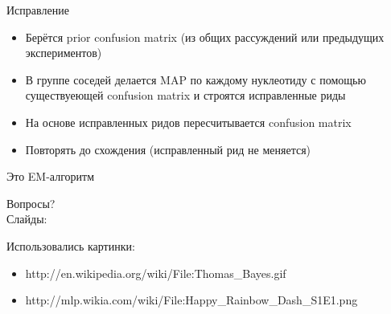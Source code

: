 \documentclass[10pt]{beamer}
\begin{document}
\begin{frame}{Исправление}
  \begin{itemize}
  \item Берётся prior confusion matrix (из общих рассуждений или
    предыдущих экспериментов)
  \item В группе соседей делается MAP по каждому нуклеотиду с помощью
    существуеющей confusion matrix и строятся исправленные риды
  \item На основе исправленных ридов пересчитывается confusion matrix
  \item Повторять до схождения (исправленный рид не меняется)
  \end{itemize}
  Это EM-алгоритм
\end{frame}

\begin{frame}[plain]
\end{frame}

\begin{frame}
  \begin{center}
    \Large
    Вопросы?\\
    Слайды:
  \end{center}
\end{frame}

\begin{frame}\label{lastframe}
  \footnotesize
  Использовались картинки:
  \begin{itemize}
    \item http://en.wikipedia.org/wiki/File:Thomas_Bayes.gif
    \item http://mlp.wikia.com/wiki/File:Happy_Rainbow_Dash_S1E1.png
  \end{itemize}
\end{frame}
\end{document}
